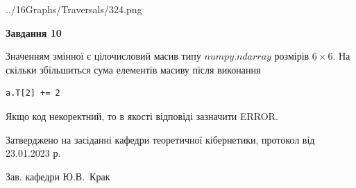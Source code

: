 \documentclass[12pt, ukrainian]{article}
\begin{document}
{\begin {large}
\begin{center}
	{../16Graphs/Traversals/324.png}
\end{center}\par
\newpage

{\begin {center}\textbf{Завдання 10}\end {center}}\par
Значенням змінної  є цілочисловий масив типу $numpy.ndarray$ розмірів $6{\times}6$. На скільки збільшиться сума елементів масиву  після виконання
\begin{verbatim}
a.T[2] += 2
\end{verbatim}


Якщо код некоректний, то в якості відповіді зазначити ERROR.\par
\newpage


\end {large}
}
{\smallskip \begin {small} Затверджено на засіданні кафедри теоретичної кібернетики, протокол  від   23.01.2023 р.\par\smallskip\smallskip
{\parbox {6.5 cm}{Зав. кафедри \dotfill Ю.В.~Крак}} \end{small}}
\end{document}
